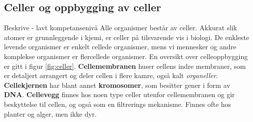 \documentclass[main.tex]{subfiles}
\begin{document}
\subsection{Celler og oppbygging av celler}
{\color{PineGreen}Beskrive - lavt kompetansenivå}
\newline\newline
Alle organismer består av celler. Akkurat slik atomer er grunnleggende i kjemi, er celler på tilsvarende vis i biologi. De enkleste levende organismer er enkelt cellede organismer, mens vi mennesker og andre komplekse organismer er flercellede organismer. En oversikt over celleoppbygging er gitt i figur \ref{fig:celler}.
\newline\newline
\textbf{Cellemembranen} huser cellens indre membraner, som er detaljert arrangert og deler cellen i flere kamre, også kalt \emph{organeller}.
\newline\newline
\textbf{Cellekjernen} har blant annet \textbf{kromosomer}, som besitter gener i form av \textbf{DNA}.
\newline\newline
\textbf{Cellevegg} finnes hos noen type celler utenfor cellemembranen og gir beskyttelse til cellen, og også som en filtrerings mekanisme. Finnes ofte hos planter og alger, men ikke dyr.
\newline\newline
\end{document}
